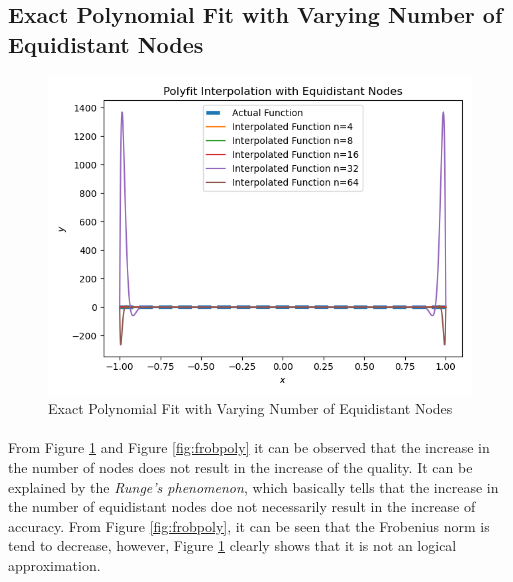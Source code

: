 \documentclass[letterpaper,12pt]{article}
\begin{document}
\subsection{Exact Polynomial Fit with Varying Number of Equidistant Nodes}
\label{sec:exactpoly}
\begin{figure}[H]
    \centerline{\includegraphics[width=\linewidth]{figures/poly.png}}
    \caption{Exact Polynomial Fit with Varying Number of Equidistant Nodes}
    \label{fig:poly}
    \end{figure}
\paragraph{} From Figure \ref{fig:poly} and Figure \ref{fig:frobpoly} it can be observed that the increase in the number of nodes does not result in the increase of the quality. It can be explained by the \textit{Runge's phenomenon}, which basically tells that the increase in the number of equidistant nodes doe not necessarily result in the increase of accuracy. From Figure \ref{fig:frobpoly}, it can be seen that the Frobenius norm is tend to decrease, however, Figure \ref{fig:poly} clearly shows that it is not an logical approximation. 
\end{document}
